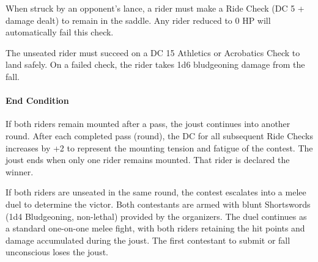 {\noindent When struck by an opponent's lance, a rider must make a Ride Check (DC 5 + damage dealt) to remain in the saddle. Any rider reduced to 0 HP will automatically fail this check.

\noindent The unseated rider must succeed on a DC 15 Athletics or Acrobatics Check to land safely. On a failed check, the rider takes 1d6 bludgeoning damage from the fall.

\paragraph*{End Condition} If both riders remain mounted after a pass, the joust continues into another round. After each completed pass (round), the DC for all subsequent Ride Checks increases by +2 to represent the mounting tension and fatigue of the contest. The joust ends when only one rider remains mounted. That rider is declared the winner.

If both riders are unseated in the same round, the contest escalates into a melee duel to determine the victor. Both contestants are armed with blunt Shortswords (1d4 Bludgeoning, non-lethal) provided by the organizers. The duel continues as a standard one-on-one melee fight, with both riders retaining the hit points and damage accumulated during the joust. The first contestant to submit or fall unconscious loses the joust.}


